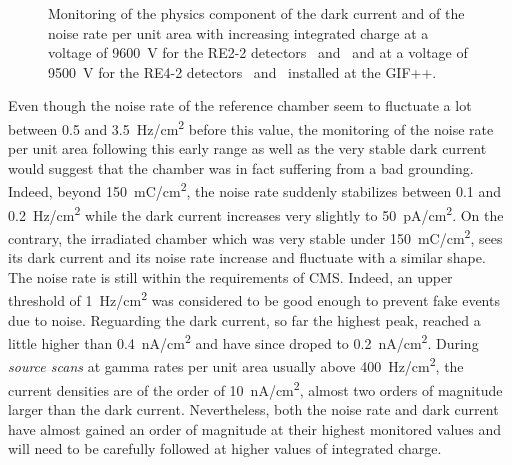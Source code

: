 \begin{figure}[H]
\begin{subfigure}{0.5\linewidth}
        	\caption{\label{fig:GIFpp-Dark-rate-mon:D}}
    	\end{subfigure}
		\caption{\label{fig:GIFpp-Dark-rate-mon} Monitoring of the physics component of the dark current and of the noise rate per unit area with increasing integrated charge at a voltage of \SI{9600}{V} for the RE2-2 detectors~ and~ and at a voltage of \SI{9500}{V} for the RE4-2 detectors~ and~ installed at the GIF++.}
	\end{figure}
	
	Even though the noise rate of the reference chamber seem to fluctuate a lot between 0.5 and \SI{3.5}{Hz/cm^2} before this value, the monitoring of the noise rate per unit area following this early range as well as the very stable dark current would suggest that the chamber was in fact suffering from a bad grounding. Indeed, beyond \SI{150}{mC/cm^2}, the noise rate suddenly stabilizes between 0.1 and \SI{0.2}{Hz/cm^2} while the dark current increases very slightly to \SI{50}{pA/cm^2}. On the contrary, the irradiated chamber which was very stable under \SI{150}{mC/cm^2}, sees its dark current and its noise rate increase and fluctuate with a similar shape. The noise rate is still within the requirements of CMS. Indeed, an upper threshold of \SI{1}{Hz/cm^2} was considered to be good enough to prevent fake events due to noise. Reguarding the dark current, so far the highest peak, reached a little higher than \SI{0.4}{nA/cm^2} and have since droped to \SI{0.2}{nA/cm^2}. During \textit{source scans} at gamma rates per unit area usually above \SI{400}{Hz/cm^2}, the current densities are of the order of \SI{10}{nA/cm^2}, almost two orders of magnitude larger than the dark current. Nevertheless, both the noise rate and dark current have almost gained an order of magnitude at their highest monitored values and will need to be carefully followed at higher values of integrated charge.

